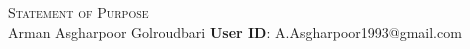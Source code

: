 \documentclass[a4,20pt]{article}
\def\Vrulefill#1#2{
    \vspace{-10pt}
    \leavevmode%
    \leaders%
    \vtop{\hsize=.0025in\vskip#1#2}%
    \hfill%
    \vspace{-2pt}
}
\begin{document}
{{\huge \scshape Statement of Purpose }} %
\\
\large{Arman Asgharpoor Golroudbari} \hfill 
{{\small{\textbf{User ID}: A.Asgharpoor1993@gmail.com}}} \\ %
\Vrulefill{-.05in}{-}
\justifying
\end{document}
